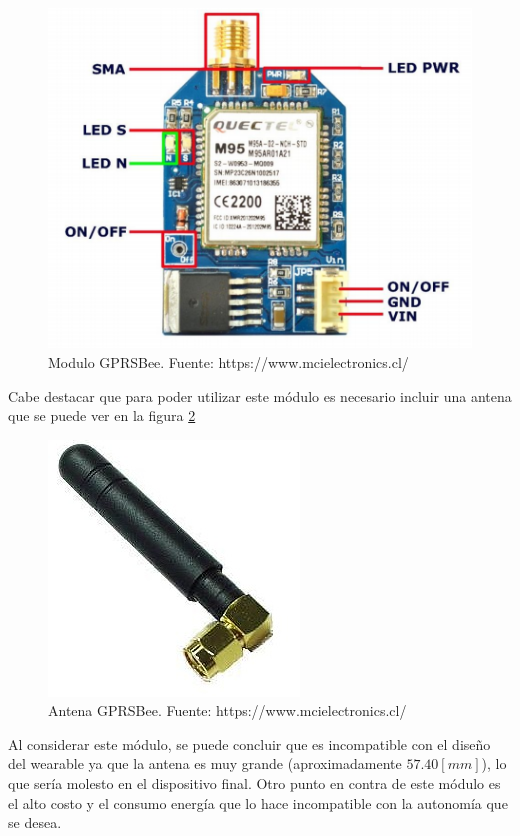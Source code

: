 \begin{figure}[H]
	\centering
	\includegraphics[scale=0.8]{figuras/com/gprs.png}
	\caption{Modulo GPRSBee. Fuente: https://www.mcielectronics.cl/}
	\label{gprs}
\end{figure}

Cabe destacar que para poder utilizar este módulo es necesario incluir una antena que se puede ver en la figura \ref{antena}

\begin{figure}[H]
	\centering
	\includegraphics[scale=0.5]{figuras/com/antena.jpg}
	\caption{Antena GPRSBee. Fuente: https://www.mcielectronics.cl/}
	\label{antena}
\end{figure}

Al considerar este módulo, se puede concluir que es incompatible con el diseño del wearable ya que la antena es muy grande (aproximadamente $57.40[mm]$), lo que sería molesto en el dispositivo final. Otro punto en contra de este módulo es el alto costo y el consumo energía que lo hace incompatible con la autonomía que se desea.

